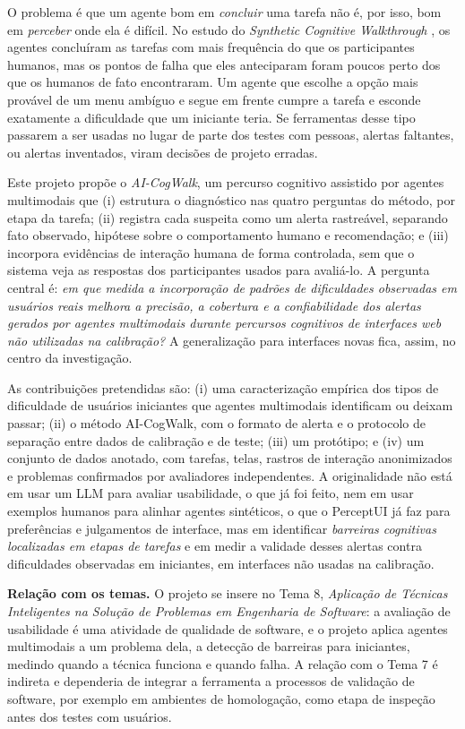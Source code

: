 \documentclass[12pt]{article}
\newcommand{\proj}{AI-CogWalk}
\begin{document}
O problema é que um agente bom em \textit{concluir} uma tarefa não é, por isso, bom em \textit{perceber} onde ela é difícil. No estudo do \textit{Synthetic Cognitive Walkthrough} \cite{zhong2025syntheticcw}, os agentes concluíram as tarefas com mais frequência do que os participantes humanos, mas os pontos de falha que eles anteciparam foram poucos perto dos que os humanos de fato encontraram. Um agente que escolhe a opção mais provável de um menu ambíguo e segue em frente cumpre a tarefa e esconde exatamente a dificuldade que um iniciante teria. Se ferramentas desse tipo passarem a ser usadas no lugar de parte dos testes com pessoas, alertas faltantes, ou alertas inventados, viram decisões de projeto erradas.

Este projeto propõe o \textit{\proj}, um percurso cognitivo assistido por agentes multimodais que (i) estrutura o diagnóstico nas quatro perguntas do método, por etapa da tarefa; (ii) registra cada suspeita como um alerta rastreável, separando fato observado, hipótese sobre o comportamento humano e recomendação; e (iii) incorpora evidências de interação humana de forma controlada, sem que o sistema veja as respostas dos participantes usados para avaliá-lo. A pergunta central é: \textit{em que medida a incorporação de padrões de dificuldades observadas em usuários reais melhora a precisão, a cobertura e a confiabilidade dos alertas gerados por agentes multimodais durante percursos cognitivos de interfaces web não utilizadas na calibração?} A generalização para interfaces novas fica, assim, no centro da investigação.

As contribuições pretendidas são: (i) uma caracterização empírica dos tipos de dificuldade de usuários iniciantes que agentes multimodais identificam ou deixam passar; (ii) o método \proj, com o formato de alerta e o protocolo de separação entre dados de calibração e de teste; (iii) um protótipo; e (iv) um conjunto de dados anotado, com tarefas, telas, rastros de interação anonimizados e problemas confirmados por avaliadores independentes. A originalidade não está em usar um LLM para avaliar usabilidade, o que já foi feito, nem em usar exemplos humanos para alinhar agentes sintéticos, o que o PerceptUI \cite{bougie2026perceptui} já faz para preferências e julgamentos de interface, mas em identificar \textit{barreiras cognitivas localizadas em etapas de tarefas} e em medir a validade desses alertas contra dificuldades observadas em iniciantes, em interfaces não usadas na calibração.

\textbf{Relação com os temas.}
O projeto se insere no Tema 8, \textit{Aplicação de Técnicas Inteligentes na Solução de Problemas em Engenharia de Software}: a avaliação de usabilidade é uma atividade de qualidade de software, e o projeto aplica agentes multimodais a um problema dela, a detecção de barreiras para iniciantes, medindo quando a técnica funciona e quando falha. A relação com o Tema 7 é indireta e dependeria de integrar a ferramenta a processos de validação de software, por exemplo em ambientes de homologação, como etapa de inspeção antes dos testes com usuários.
\end{document}
